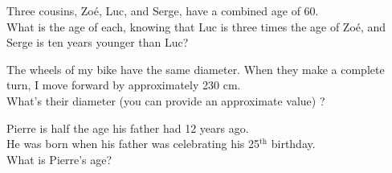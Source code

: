 \documentclass[12pt,a4paper,article,english,firamath]{nsi}
\begin{document}
\maketitle

\begin{exercice}[]
    Three cousins, Zoé, Luc, and Serge, have a combined age of 60.\\
    
    What is the age of each, knowing that Luc is three times the age of Zoé, and Serge is ten years younger than Luc?
\end{exercice}


\begin{exercice}[]
    The wheels of my bike have the same diameter. When they make a complete turn, I move forward by approximately 230 cm.\\

    What's their diameter (you can provide an approximate value) ?
\end{exercice}

\begin{exercice}[]
    Pierre is half the age his father had 12 years ago.\\
    He was born when his father was celebrating his 25$^{\text{th}}$ birthday.\\
    
    What is Pierre's age?
\end{exercice}
\end{document}
